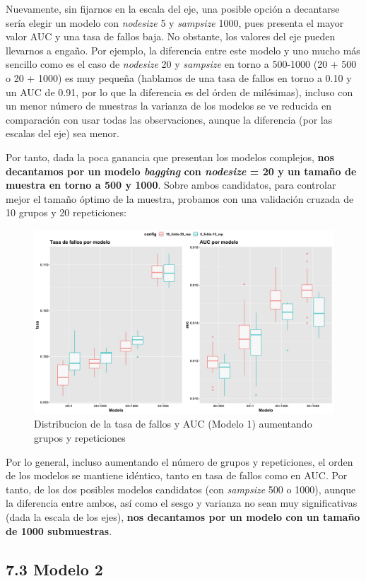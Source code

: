 \documentclass[
]{article}
\begin{document}
Nuevamente, sin fijarnos en la escala del eje, una posible opción a
decantarse sería elegir un modelo con \emph{nodesize} 5 y
\emph{sampsize} 1000, pues presenta el mayor valor AUC y una tasa de
fallos baja. No obstante, los valores del eje pueden llevarnos a engaño.
Por ejemplo, la diferencia entre este modelo y uno mucho más sencillo
como es el caso de \emph{nodesize} 20 y \emph{sampsize} en torno a
500-1000 (20 + 500 o 20 + 1000) es muy pequeña (hablamos de una tasa de
fallos en torno a 0.10 y un AUC de 0.91, por lo que la diferencia es del
órden de milésimas), incluso con un menor número de muestras la varianza
de los modelos se ve reducida en comparación con usar todas las
observaciones, aunque la diferencia (por las escalas del eje) sea menor.

Por tanto, dada la poca ganancia que presentan los modelos complejos,
\textbf{nos decantamos por un modelo \emph{bagging} con \emph{nodesize}
= 20 y un tamaño de muestra en torno a 500 y 1000}. Sobre ambos
candidatos, para controlar mejor el tamaño óptimo de la muestra,
probamos con una validación cruzada de 10 grupos y 20 repeticiones:

\begin{figure}[h!]

{\centering \includegraphics[width=0.99\linewidth,height=0.99\textheight,]{./charts/bagging/bis_03_comparacion_final_modelo1_5_10_folds} 

}

\caption{Distribucion de la tasa de fallos y AUC (Modelo 1) aumentando grupos y repeticiones}\label{fig:unnamed-chunk-71}
\end{figure}

Por lo general, incluso aumentando el número de grupos y repeticiones,
el orden de los modelos se mantiene idéntico, tanto en tasa de fallos
como en AUC. Por tanto, de los dos posibles modelos candidatos (con
\emph{sampsize} 500 o 1000), aunque la diferencia entre ambos, así como
el sesgo y varianza no sean muy significativas (dada la escala de los
ejes), \textbf{nos decantamos por un modelo con un tamaño de 1000
submuestras}.

\hypertarget{modelo-2}{%
\subsection{7.3 Modelo 2}\label{modelo-2}}
\end{document}
